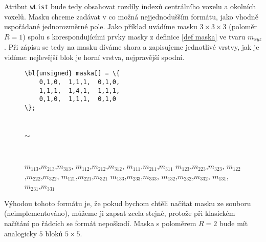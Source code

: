     Atribut {\tt wList} bude tedy obsahovat rozdíly indexů centrálního voxelu a okolních voxelů. Masku chceme zadávat v co možná nejjednodušším formátu, jako vhodně uspořádané jednorozměrné pole. Jako příklad uvádíme masku $3\times 3\times3$ (poloměr $R = 1$) spolu s korespondujícími prvky masky z definice \ref{def maska} ve tvaru $m_{xyz}$. Při zápisu se tedy na masku díváme shora a zapisujeme jednotlivé vrstvy, jak je vidíme: nejlevější blok je horní vrstva, nejpravější spodní.
\begin{figure}[h]
    \begin{minipage}[l]{0.5\textwidth-2.2cm}
    \begin{Verbatim}[commandchars = \\\{\}]
\bl{unsigned} maska[] = \{
    0,1,0,  1,1,1,  0,1,0,
    1,1,1,  1,4,1,  1,1,1,
    0,1,0,  1,1,1,  0,1,0
\};
    \end{Verbatim}
    \end{minipage}
    \begin{minipage}[c]{1cm}
    \begin{Verbatim}[commandchars = \\\{\}]


    \end{Verbatim}
    \center $\sim$
    \begin{Verbatim}[commandchars = \\\{\}]


    \end{Verbatim}
    \end{minipage}
    \begin{minipage}[r]{0.5\textwidth+1.2cm}
    \vspace{0.45cm}
    \flushright
    $m_{113}$,$m_{213}$,$m_{313}$, $m_{112}$,$m_{212}$,$m_{312}$, $m_{111}$,$m_{211}$,$m_{311}$\newline
    $m_{123}$,$m_{223}$,$m_{323}$, $m_{122}$,$m_{222}$,$m_{322}$, $m_{121}$,$m_{221}$,$m_{321}$\newline
    $m_{133}$,$m_{233}$,$m_{333}$, $m_{132}$,$m_{232}$,$m_{332}$, $m_{131}$,$m_{231}$,$m_{331}$\newline
    \end{minipage}

\end{figure}

    Výhodou tohoto formátu je, že pokud bychom chtěli načítat masku ze souboru (neimplementováno), můžeme ji zapsat zcela stejně, protože při klasickém načítání po řádcích se formát nepoškodí. Maska s poloměrem $R = 2$ bude mít analogicky $5$ bloků $5\times 5$.

